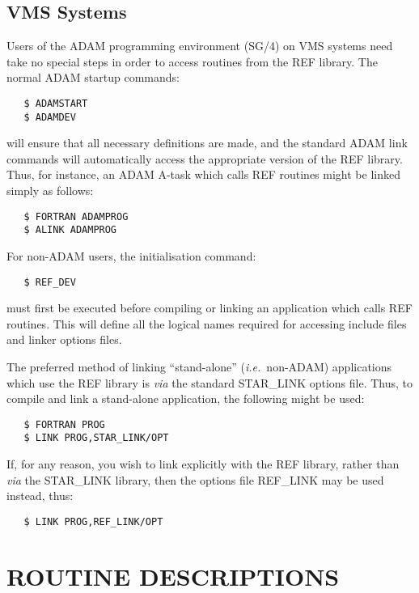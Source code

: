 \subsection{VMS Systems}

Users of the ADAM programming environment (SG/4) on VMS systems need take no
special steps in order to access routines from the REF library. The normal ADAM
startup commands:

\begin{verbatim}
   $ ADAMSTART
   $ ADAMDEV
\end{verbatim}

will ensure that all necessary definitions are made, and the standard ADAM link
commands will automatically access the appropriate version of the REF library.
Thus, for instance, an ADAM A-task which calls REF routines might be linked
simply as follows:

\begin{verbatim}
   $ FORTRAN ADAMPROG
   $ ALINK ADAMPROG
\end{verbatim}

For non-ADAM users, the initialisation command:

\begin{verbatim}
   $ REF_DEV
\end{verbatim}

must first be executed before compiling or linking an application which calls
REF routines. This will define all the logical names required for accessing
include files and linker options files.

The preferred method of linking ``stand-alone'' ({\em i.e.}\ non-ADAM)
applications which use the REF library is {\em via} the standard STAR\_LINK
options file. Thus, to compile and link a stand-alone application, the
following might be used:

\begin{verbatim}
   $ FORTRAN PROG
   $ LINK PROG,STAR_LINK/OPT
\end{verbatim}

If, for any reason, you wish to link explicitly with the REF library, rather
than {\em via} the STAR\_LINK library, then the options file REF\_LINK may be
used instead, thus:

\begin{verbatim}
   $ LINK PROG,REF_LINK/OPT
\end{verbatim}

\appendix
\newpage
\section{ROUTINE DESCRIPTIONS}

